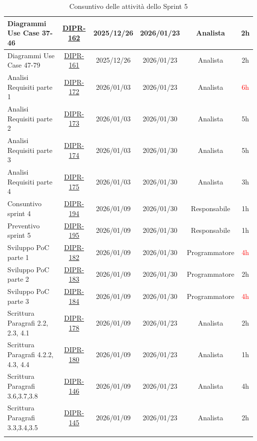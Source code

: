 \documentclass[a4paper,12pt]{article}
\begin{document}
\begin{longtable}{|p{4cm}|c|c|c|c|c|}
        \hline
        Diagrammi Use Case 37-46 & \href{https://7zpus.atlassian.net/browse/DIPR-162}{DIPR-162} & 2025/12/26 & 2026/01/23 & Analista & 2h \\
        \hline
        Diagrammi Use Case 47-79 & \href{https://7zpus.atlassian.net/browse/DIPR-161}{DIPR-161} & 2025/12/26 & 2026/01/23 & Analista & 2h \\
        \hline
        Analisi Requisiti parte 1 & \href{https://7zpus.atlassian.net/browse/DIPR-172}{DIPR-172} & 2026/01/03 & 2026/01/23 & Analista & \textcolor{red}{6h} \\
        \hline
        Analisi Requisiti parte 2 & \href{https://7zpus.atlassian.net/browse/DIPR-173}{DIPR-173} & 2026/01/03 & 2026/01/30 & Analista & 5h \\
        \hline
        Analisi Requisiti parte 3 & \href{https://7zpus.atlassian.net/browse/DIPR-174}{DIPR-174} & 2026/01/03 & 2026/01/30 & Analista & 5h \\
        \hline
        Analisi Requisiti parte 4 & \href{https://7zpus.atlassian.net/browse/DIPR-175}{DIPR-175} & 2026/01/03 & 2026/01/30 & Analista & \textcolor{green!50!black}{3h}\\
        \hline
        Consuntivo sprint 4 & \href{https://7zpus.atlassian.net/browse/DIPR-194}{DIPR-194} & 2026/01/09 & 2026/01/30 & Responsabile & 1h \\
        \hline
        Preventivo sprint 5 & \href{https://7zpus.atlassian.net/browse/DIPR-195}{DIPR-195} & 2026/01/09 & 2026/01/30 & Responsabile & 1h \\
        \hline
        Sviluppo PoC parte 1 & \href{https://7zpus.atlassian.net/browse/DIPR-182}{DIPR-182} & 2026/01/09 & 2026/01/30 & Programmatore & \textcolor{red}{4h}\\
        \hline
        Sviluppo PoC parte 2 & \href{https://7zpus.atlassian.net/browse/DIPR-183}{DIPR-183} & 2026/01/09 & 2026/01/30 & Programmatore & 2h \\
        \hline
        Sviluppo PoC parte 3 & \href{https://7zpus.atlassian.net/browse/DIPR-184}{DIPR-184} & 2026/01/09 & 2026/01/30 & Programmatore & \textcolor{red}{4h}\\
        \hline
        Scrittura Paragrafi 2.2, 2.3, 4.1 & \href{https://7zpus.atlassian.net/browse/DIPR-178}{DIPR-178} & 2026/01/09 & 2026/01/23 & Analista & 2h \\
        \hline
        Scrittura Paragrafi 4.2.2, 4.3, 4.4 & \href{https://7zpus.atlassian.net/browse/DIPR-180}{DIPR-180} & 2026/01/09 & 2026/01/23 & Analista & \textcolor{green!50!black}{1h} \\
        \hline
        Scrittura Paragrafi 3.6,3.7,3.8& \href{https://7zpus.atlassian.net/browse/DIPR-146}{DIPR-146} & 2026/01/09 & 2026/01/23 & Analista & 4h \\
        \hline
        Scrittura Paragrafi 3.3,3.4,3.5 & \href{https://7zpus.atlassian.net/browse/DIPR-145}{DIPR-145} & 2026/01/09 & 2026/01/23 & Analista & \textcolor{green!50!black}{2h}\\
        \hline
        \rowcolor{white}
        \caption{Consuntivo delle attività dello Sprint 5}
\end{longtable}
\end{document}
